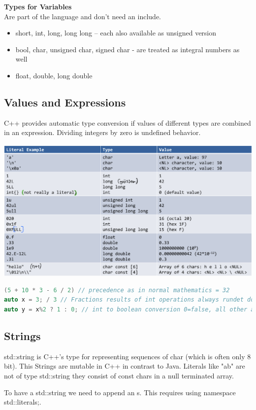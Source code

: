 \textbf{Types for Variables}\\
Are part of the language and don't need an include.
\begin{itemize}
  \itemsep -0.5em 
  \item  short, int, long, long long – each also available as unsigned version
  \item bool, char, unsigned char, signed char - are treated as integral numbers as well
  \item float, double, long double
\end{itemize}

\subsection{Values and Expressions}
C++ provides automatic type conversion if values of different types are combined in an expression. Dividing integers by zero is undefined behavior.

\includegraphics[width=0.75\linewidth]{images/literalexamples}

\begin{lstlisting}[language=C++]
(5 + 10 * 3 - 6 / 2) // precedence as in normal mathematics = 32
auto x = 3; / 3 // Fractions results of int operations always rundet down! 1
auto y = x%2 ? 1 : 0; // int to boolean conversion 0=false, all other are true. = 1
\end{lstlisting}

\subsection{Strings}
 std::string is C++'s type for representing sequences of char (which is often only 8 bit). This Strings are mutable in C++ in contrast to Java. Literals like "ab" are not of type std::string they consist of const chars in a null terminated array.
 
 To have a std::string we need to append an s. This requires using namespace std::literals;.
 
